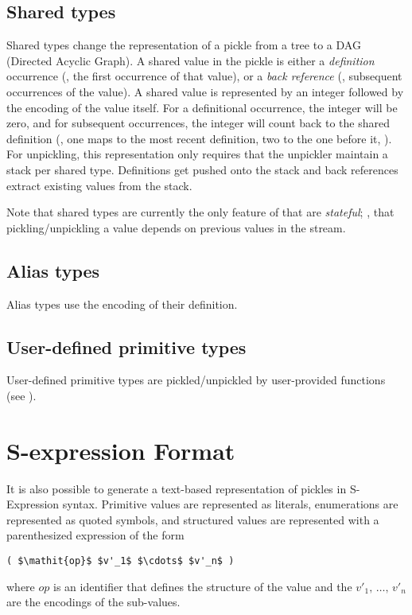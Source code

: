 \subsection{Shared types}
\label{sec:shared-pickle-rep}

Shared types change the representation of a pickle from a tree to a DAG
(Directed Acyclic Graph).  A shared value in the pickle is
either a \emph{definition} occurrence (\ie{}, the first occurrence of that
value), or a \emph{back reference} (\ie{}, subsequent occurrences of the value).
A shared value is represented by an integer followed by the encoding of the
value itself.  For a definitional occurrence, the integer will be zero, and
for subsequent occurrences, the integer will count back to the shared definition
(\eg{}, one maps to the most recent definition, two to the one before it, \etc{}).
For unpickling, this representation only requires that the unpickler maintain
a stack per shared type.  Definitions get pushed onto the stack and back references
extract existing values from the stack.

Note that shared types are currently the only feature of \asdl{} that are
\emph{stateful}; \ie{}, that pickling/unpickling a value depends on previous
values in the stream.

\subsection{Alias types}
Alias types use the encoding of their definition.

\subsection{User-defined primitive types}
User-defined primitive types are pickled/unpickled by user-provided functions (see
).

\section{S-expression Format}
\label{sec:s-expressions}
It is also possible to generate a text-based representation of pickles in S-Expression
syntax.
Primitive values are represented as literals, enumerations are represented
as quoted symbols, and structured values are represented with a parenthesized
expression of the form
\begin{code}\begin{lstlisting}[mathescape=true]
( $\mathit{op}$ $v'_1$ $\cdots$ $v'_n$ )
\end{lstlisting}\end{code}%
where $\mathit{op}$ is an identifier that defines the structure of the value
and the $v'_1,\,\ldots,\,v'_n$ are the encodings of the sub-values.

